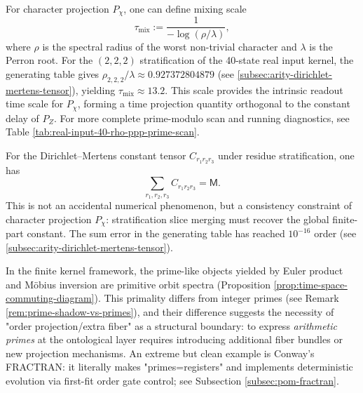 \begin{remark}\label{rem:pom-chi-mixing}
For character projection $P_\chi$, one can define mixing scale
\[
\tau_{\mathrm{mix}}:=\frac{1}{-\log(\rho/\lambda)},
\]
where $\rho$ is the spectral radius of the worst non-trivial character and $\lambda$ is the Perron root. For the $(2,2,2)$ stratification of the 40-state real input kernel, the generating table gives
\(
\rho_{2,2,2}/\lambda\approx 0.927372804879
\)
(see \ref{subsec:arity-dirichlet-mertens-tensor}), yielding $\tau_{\mathrm{mix}}\approx 13.2$. This scale provides the intrinsic readout time scale for $P_\chi$, forming a time projection quantity orthogonal to the constant delay of $P_Z$.
For more complete prime-modulo scan and running diagnostics, see Table \ref{tab:real-input-40-rho-ppp-prime-scan}.
\end{remark}

\begin{remark}\label{rem:pom-chi-sum}
For the Dirichlet--Mertens constant tensor $C_{r_1r_2r_3}$ under residue stratification, one has
\[
\sum_{r_1,r_2,r_3} C_{r_1r_2r_3}=\mathsf{M}.
\]
This is not an accidental numerical phenomenon, but a consistency constraint of character projection $P_\chi$: stratification slice merging must recover the global finite-part constant. The sum error in the generating table has reached $10^{-16}$ order (see \ref{subsec:arity-dirichlet-mertens-tensor}).
\end{remark}

\begin{remark}
In the finite kernel framework, the prime-like objects yielded by Euler product and Möbius inversion are primitive orbit spectra (Proposition \ref{prop:time-space-commuting-diagram}). This primality differs from integer primes (see Remark \ref{rem:prime-shadow-vs-primes}), and their difference suggests the necessity of "order projection/extra fiber" as a structural boundary: to express \emph{arithmetic primes} at the ontological layer requires introducing additional fiber bundles or new projection mechanisms. An extreme but clean example is Conway's FRACTRAN: it literally makes "primes=registers" and implements deterministic evolution via first-fit order gate control; see Subsection \ref{subsec:pom-fractran}.
\end{remark}

